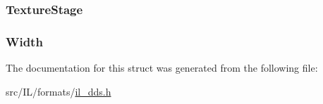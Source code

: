 \hypertarget{struct_d_d_s_h_e_a_d_aef9877c58d18d7df70e948cd489d7947}{
\subsubsection[{Texture\-Stage}]{ Texture\-Stage}}\label{struct_d_d_s_h_e_a_d_aef9877c58d18d7df70e948cd489d7947}
\hypertarget{struct_d_d_s_h_e_a_d_a4146e7b2b0b4097e0e335f9b348392bf}{
\subsubsection[{Width}]{ Width}}\label{struct_d_d_s_h_e_a_d_a4146e7b2b0b4097e0e335f9b348392bf}


The documentation for this struct was generated from the following file\-:\begin{DoxyCompactItemize}
\item 
src/\-I\-L/formats/\hyperlink{il__dds_8h}{il\-\_\-dds.\-h}\end{DoxyCompactItemize}
